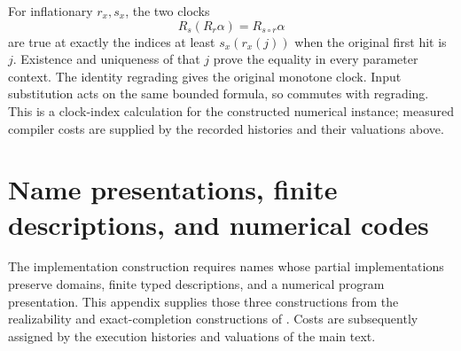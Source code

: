 \documentclass[11pt,a4paper]{article}
\numberwithin{algorithm}{section}
\numberwithin{equation}{section}
\theoremstyle{definition}
\theoremstyle{remark}
\theoremstyle{plain}
\theoremstyle{definition}
\theoremstyle{plain}
\begin{document}
For inflationary $r_x,s_x$, the two clocks
\[
 R_s(R_r\alpha)=R_{s\circ r}\alpha
\]
are true at exactly the indices at least $s_x(r_x(j))$ when the original
first hit is $j$. Existence and uniqueness of that $j$ prove the equality
in every parameter context. The identity regrading gives the original
monotone clock. Input substitution acts on the same bounded formula,
so commutes with regrading. This is a clock-index calculation for the
constructed numerical instance; measured compiler costs are supplied
by the recorded histories and their valuations above.

\section{Name presentations, finite descriptions, and numerical codes}
\label{app:names-codes}
The implementation construction requires names whose partial implementations preserve
domains, finite typed descriptions, and a numerical
program presentation. This appendix supplies those three
constructions from the realizability and exact-completion
constructions of
\citep{Hyland1982EffectiveTopos,VanOosten2008Realizability}.
Costs are subsequently assigned by the execution histories
and valuations of the main text.
\end{document}
